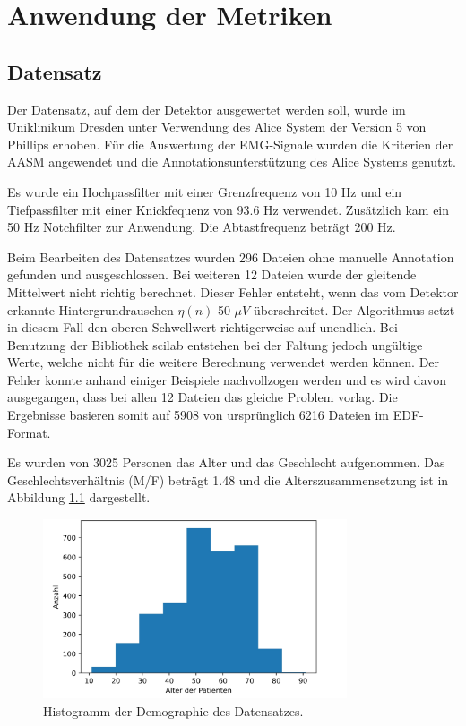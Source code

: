 \chapter{Anwendung der Metriken}\label{chap:Anwendung_der_Metriken}
\section{Datensatz}\label{chap:Datensatz}
Der Datensatz, auf dem der Detektor ausgewertet werden soll, wurde im Uniklinikum Dresden  unter Verwendung des Alice System der Version 5 von Phillips erhoben. Für die Auswertung der EMG-Signale wurden die Kriterien der AASM angewendet und die Annotationsunterstützung des Alice Systems genutzt. 

Es wurde ein Hochpassfilter mit einer Grenzfrequenz von 10 Hz und ein Tiefpassfilter mit einer Knickfequenz von 93.6 Hz verwendet. Zusätzlich kam ein 50 Hz Notchfilter zur Anwendung. Die Abtastfrequenz beträgt 200 Hz.

Beim Bearbeiten des Datensatzes wurden 296 Dateien ohne manuelle Annotation gefunden und ausgeschlossen. 
Bei weiteren 12 Dateien wurde der gleitende Mittelwert nicht richtig berechnet. Dieser Fehler entsteht, wenn das vom Detektor erkannte Hintergrundrauschen $\eta(n)$ 50 $\mu V$ überschreitet. Der Algorithmus setzt in diesem Fall den oberen Schwellwert richtigerweise auf unendlich. Bei Benutzung der Bibliothek scilab entstehen bei der Faltung jedoch ungültige Werte, welche nicht für die weitere Berechnung verwendet werden können. Der Fehler konnte anhand einiger Beispiele nachvollzogen werden und es wird davon ausgegangen, dass bei allen 12 Dateien das gleiche Problem vorlag.
Die Ergebnisse basieren somit auf 5908 von ursprünglich 6216 Dateien im EDF-Format.


Es wurden von 3025 Personen das Alter und das Geschlecht aufgenommen. Das Geschlechtsverhältnis (M/F) beträgt 1.48 und die Alterszusammensetzung ist in Abbildung \ref{fig:Altershist} dargestellt.
\begin{figure}[!ht]%
	\begin{center}
	\includegraphics[width=0.80\textwidth]{./Bilder/MetadataAltershistogramm.jpg}
	\end{center}
	\caption{Histogramm der Demographie des Datensatzes.}%
	\label{fig:Altershist}%
\end{figure}


